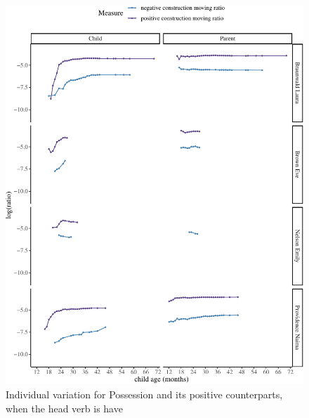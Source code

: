 \documentclass[
  english,
  man,floatsintext]{apa6}
\begin{document}
\begin{figure}[H]

{\centering \includegraphics{neg_construction_article_files/figure-latex/individualpossessionhave-1} 

}

\caption{Individual variation for Possession and its positive counterparts, when the head verb is have}\label{fig:individualpossessionhave}
\end{figure}
\end{document}
